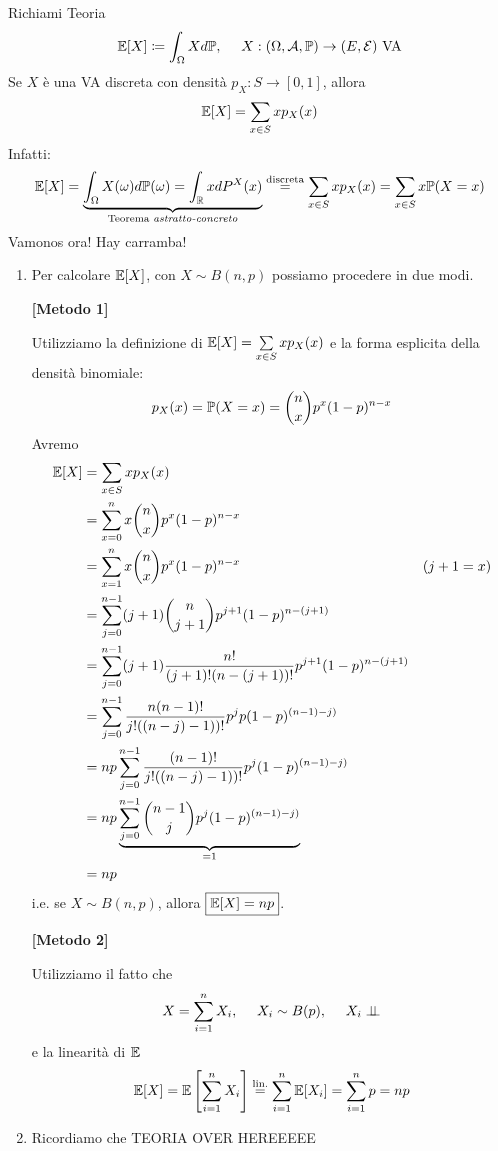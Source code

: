 Richiami Teoria
\begin{equation*}
\mathbb{E}[X] \coloneqq \int_{\Omega } Xd\mathbb{P} ,\ \ \ \ X:(\Omega,\mathcal{A},\mathbb{P})\rightarrow (E,\mathcal{E}) \ \text{VA}
\end{equation*}
Se $X$ è una VA discreta con densità $p_{X} :S\rightarrow [0,1]$, allora
\begin{equation*}
\mathbb{E}[X] =\sum\limits_{x\in S} xp_{X}(x)
\end{equation*}
Infatti:
\begin{equation*}
\mathbb{E}[X] =\underbrace{\int_{\Omega } X(\omega) d\mathbb{P}(\omega) =\int_{\mathbb{R}} xdP^{X}(x)}_{\text{Teorema \emph{astratto-concreto}}}\overset{\text{discreta}}{=}\sum\limits_{x\in S} xp_{X}(x) =\sum\limits_{x\in S} x\mathbb{P}(X=x)
\end{equation*}
Vamonos ora! Hay carramba!
\begin{enumerate}
\item Per calcolare $\mathbb{E}[X]$, con $X\sim B(n,p)$ possiamo procedere in due modi.

\textbf{[Metodo 1]}

Utilizziamo la definizione di $\mathbb{E}[X] =\sum\limits_{x\in S} xp_{X}(x)$ e la forma esplicita della densità binomiale:
\begin{equation*}
p_{X}(x) =\mathbb{P}(X=x) =\binom{n}{x} p^{x}(1-p)^{n-x}
\end{equation*}
Avremo
\begin{align*}
\mathbb{E}[X] & =\sum\limits_{x\in S} xp_{X}(x) & \\
 & =\sum\limits_{x=0}^{n} x\binom{n}{x} p^{x}(1-p)^{n-x} & \\
 & =\sum\limits_{x=1}^{n} x\binom{n}{x} p^{x}(1-p)^{n-x} & (j+1=x)\\
 & =\sum\limits_{j=0}^{n-1}(j+1)\binom{n}{j+1} p^{j+1}(1-p)^{n-(j+1)} & \\
 & =\sum\limits_{j=0}^{n-1}(j+1)\frac{n!}{(j+1) !(n-(j+1)) !} p^{j+1}(1-p)^{n-(j+1)} & \\
 & =\sum\limits_{j=0}^{n-1}\frac{n(n-1) !}{j!((n-j) -1)) !} p^{j} p(1-p)^{(n-1) -j)} & \\
 & =np\sum\limits_{j=0}^{n-1}\frac{(n-1) !}{j!((n-j) -1)) !} p^{j}(1-p)^{(n-1) -j)} & \\
 & =np\underbrace{\sum\limits_{j=0}^{n-1}\binom{n-1}{j} p^{j}(1-p)^{(n-1) -j)}}_{=1} & \\
 & =np & 
\end{align*}
i.e. se $X\sim B(n,p)$, allora $\boxed{\mathbb{E}[X] =np}$.

\textbf{[Metodo 2]}

Utilizziamo il fatto che
\begin{equation*}
X=\sum\limits _{i=1}^{n} X_{i} ,\ \ \ \ X_{i} \sim B(p) ,\ \ \ \ X_{i} \perp \!\!\! \perp 
\end{equation*}
e la linearità di $\mathbb{E}$
\begin{equation*}
\mathbb{E}[X] =\mathbb{E}\left[\sum\limits_{i=1}^{n} X_{i}\right]\overset{\text{lin.}}{=}\sum\limits_{i=1}^{n}\mathbb{E}[X_{i}] =\sum\limits_{i=1}^{n} p=np
\end{equation*}
\item Ricordiamo che TEORIA OVER HEREEEEE


\end{enumerate}
